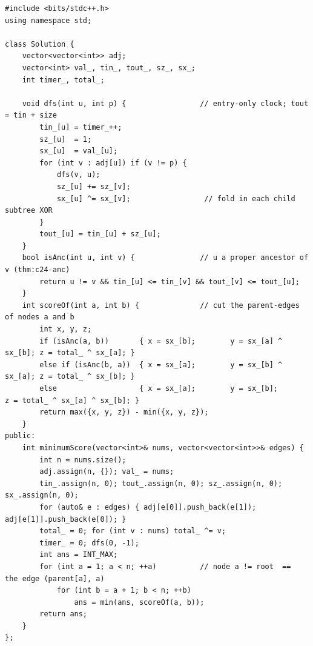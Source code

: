 \begin{lstlisting}[caption={Minimum Score After Removals on a Tree (LeetCode 2322) -- subtree XOR + tin/tout case split}, label={lst:c24-summit}]
#include <bits/stdc++.h>
using namespace std;

class Solution {
    vector<vector<int>> adj;
    vector<int> val_, tin_, tout_, sz_, sx_;
    int timer_, total_;

    void dfs(int u, int p) {                 // entry-only clock; tout = tin + size
        tin_[u] = timer_++;
        sz_[u]  = 1;
        sx_[u]  = val_[u];
        for (int v : adj[u]) if (v != p) {
            dfs(v, u);
            sz_[u] += sz_[v];
            sx_[u] ^= sx_[v];                 // fold in each child subtree XOR
        }
        tout_[u] = tin_[u] + sz_[u];
    }
    bool isAnc(int u, int v) {               // u a proper ancestor of v (thm:c24-anc)
        return u != v && tin_[u] <= tin_[v] && tout_[v] <= tout_[u];
    }
    int scoreOf(int a, int b) {              // cut the parent-edges of nodes a and b
        int x, y, z;
        if (isAnc(a, b))       { x = sx_[b];        y = sx_[a] ^ sx_[b]; z = total_ ^ sx_[a]; }
        else if (isAnc(b, a))  { x = sx_[a];        y = sx_[b] ^ sx_[a]; z = total_ ^ sx_[b]; }
        else                   { x = sx_[a];        y = sx_[b];           z = total_ ^ sx_[a] ^ sx_[b]; }
        return max({x, y, z}) - min({x, y, z});
    }
public:
    int minimumScore(vector<int>& nums, vector<vector<int>>& edges) {
        int n = nums.size();
        adj.assign(n, {}); val_ = nums;
        tin_.assign(n, 0); tout_.assign(n, 0); sz_.assign(n, 0); sx_.assign(n, 0);
        for (auto& e : edges) { adj[e[0]].push_back(e[1]); adj[e[1]].push_back(e[0]); }
        total_ = 0; for (int v : nums) total_ ^= v;
        timer_ = 0; dfs(0, -1);
        int ans = INT_MAX;
        for (int a = 1; a < n; ++a)          // node a != root  ==  the edge (parent[a], a)
            for (int b = a + 1; b < n; ++b)
                ans = min(ans, scoreOf(a, b));
        return ans;
    }
};
\end{lstlisting}

